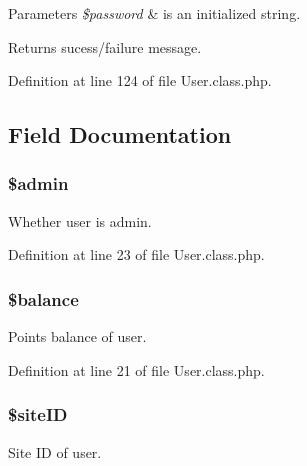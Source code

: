 \begin{DoxyParams}{Parameters}
{\em \$password} & is an initialized string. \\
\hline
\end{DoxyParams}
\begin{DoxyReturn}{Returns}
sucess/failure message. 
\end{DoxyReturn}


Definition at line 124 of file User.\-class.\-php.



\subsection{Field Documentation}
\hypertarget{classmnorman_leads_1_1_user_ad3b3c64b25fbbb6aec24407e4333aa71}{
\subsubsection[{\$admin}]{\setlength{\rightskip}{0pt plus 5cm}\$admin\hspace{0.3cm}{\ttfamily [private]}}}\label{classmnorman_leads_1_1_user_ad3b3c64b25fbbb6aec24407e4333aa71}
Whether user is admin. 

Definition at line 23 of file User.\-class.\-php.

\hypertarget{classmnorman_leads_1_1_user_ac600cdfc056c66926d1b3f5aff7088a9}{
\subsubsection[{\$balance}]{\setlength{\rightskip}{0pt plus 5cm}\$balance\hspace{0.3cm}{\ttfamily [private]}}}\label{classmnorman_leads_1_1_user_ac600cdfc056c66926d1b3f5aff7088a9}
Points balance of user. 

Definition at line 21 of file User.\-class.\-php.

\hypertarget{classmnorman_leads_1_1_user_a70db0a8c5bfb8523860867c5670cd399}{
\subsubsection[{\$site\-I\-D}]{\setlength{\rightskip}{0pt plus 5cm}\$site\-I\-D\hspace{0.3cm}{\ttfamily [private]}}}\label{classmnorman_leads_1_1_user_a70db0a8c5bfb8523860867c5670cd399}
Site I\-D of user. 


